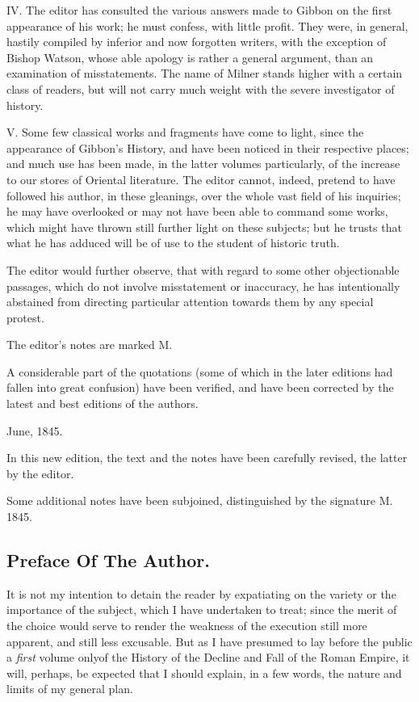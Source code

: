 IV. The editor has consulted the various answers made to Gibbon on the first appearance of his work; he must confess, with little profit. They were, in general, hastily compiled by inferior and now forgotten writers, with the exception of Bishop Watson, whose able apology is rather a general argument, than an examination of misstatements. The name of Milner stands higher with a certain class of readers, but will not carry much weight with the severe investigator of history.

V. Some few classical works and fragments have come to light, since the appearance of Gibbon’s History, and have been noticed in their respective places; and much use has been made, in the latter volumes particularly, of the increase to our stores of Oriental literature. The editor cannot, indeed, pretend to have followed his author, in these gleanings, over the whole vast field of his inquiries; he may have overlooked or may not have been able to command some works, which might have thrown still further light on these subjects; but he trusts that what he has adduced will be of use to the student of historic truth.

The editor would further observe, that with regard to some other objectionable passages, which do not involve misstatement or inaccuracy, he has intentionally abstained from directing particular attention towards them by any special protest.

The editor’s notes are marked M.

A considerable part of the quotations (some of which in the later editions had fallen into great confusion) have been verified, and have been corrected by the latest and best editions of the authors.

June, 1845.

In this new edition, the text and the notes have been carefully revised, the latter by the editor.

Some additional notes have been subjoined, distinguished by the signature M. 1845.

\subsection{Preface Of The Author.}

It is not my intention to detain the reader by expatiating on the variety or the importance of the subject, which I have undertaken to treat; since the merit of the choice would serve to render the weakness of the execution still more apparent, and still less excusable. But as I have presumed to lay before the public a \textit{first} volume only\footnotemark[1] of the History of the Decline and Fall of the Roman Empire, it will, perhaps, be expected that I should explain, in a few words, the nature and limits of my general plan.

